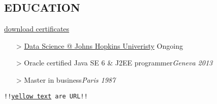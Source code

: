 \documentclass{res}
\begin{document}
\begin{resume}
\section{EDUCATION}  \hfill\href{https://drive.google.com/file/d/0BzNXwOua274uZ3A2LVNNRjEzaGc/view?usp=sharing}{download certificates}
\begin{enumerate}[leftmargin=0cm]
\item[>]\href{https://www.coursera.org/specialization/jhudatascience/1?utm_medium=dashboard}{Data Science @ Johns Hopkins Univeristy} \hfill Ongoing
\item[>]Oracle certified Java SE 6 \& J2EE programmer\hfill \textit{Geneva 2013}
\item[>]Master in business\hfill \textit{Paris 1987}
\end{enumerate}					

\vspace{1.2cm}
\centerline{\texttt{!!\textcolor{myyellow}{\href{https://www.google.fr/}{yellow text}} are URL!!}}


\end{resume}
\end{document}
